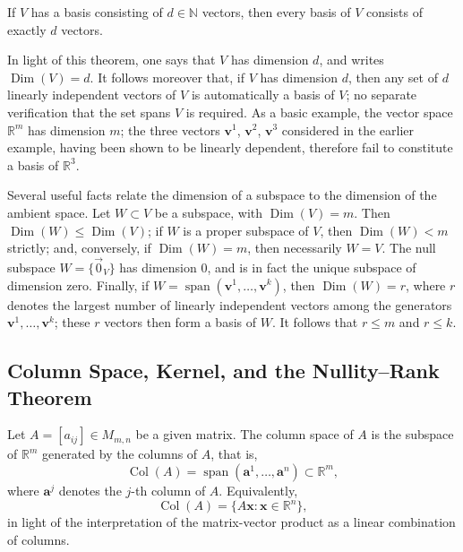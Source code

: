 \begin{theorem}
If $V$ has a basis consisting of $d \in \mathbb{N}$ vectors, then every basis of $V$ consists of exactly $d$ vectors.
\end{theorem}

In light of this theorem, one says that $V$ has dimension $d$, and writes $\operatorname{Dim}(V) = d$. It follows moreover that, if $V$ has dimension $d$, then any set of $d$ linearly independent vectors of $V$ is automatically a basis of $V$; no separate verification that the set spans $V$ is required. As a basic example, the vector space $\mathbb{R}^m$ has dimension $m$; the three vectors $\mathbf{v}^1$, $\mathbf{v}^2$, $\mathbf{v}^3$ considered in the earlier example, having been shown to be linearly dependent, therefore fail to constitute a basis of $\mathbb{R}^3$.

Several useful facts relate the dimension of a subspace to the dimension of the ambient space. Let $W \subset V$ be a subspace, with $\operatorname{Dim}(V) = m$. Then $\operatorname{Dim}(W) \leq \operatorname{Dim}(V)$; if $W$ is a proper subspace of $V$, then $\operatorname{Dim}(W) < m$ strictly; and, conversely, if $\operatorname{Dim}(W) = m$, then necessarily $W = V$. The null subspace $W = \{\vec{0}_V\}$ has dimension $0$, and is in fact the unique subspace of dimension zero. Finally, if $W = \operatorname{span}(\mathbf{v}^1, \dots, \mathbf{v}^k)$, then $\operatorname{Dim}(W) = r$, where $r$ denotes the largest number of linearly independent vectors among the generators $\mathbf{v}^1, \dots, \mathbf{v}^k$; these $r$ vectors then form a basis of $W$. It follows that $r \leq m$ and $r \leq k$.

\subsection{Column Space, Kernel, and the Nullity--Rank Theorem}

\begin{definition}
Let $A = [a_{ij}] \in M_{m,n}$ be a given matrix. The column space of $A$ is the subspace of $\mathbb{R}^m$ generated by the columns of $A$, that is,
\[
\operatorname{Col}(A) = \operatorname{span}(\mathbf{a}^1, \dots, \mathbf{a}^n) \subset \mathbb{R}^m,
\] where $\mathbf{a}^j$ denotes the $j$-th column of $A$. Equivalently,
\[
\operatorname{Col}(A) = \{ A\mathbf{x} : \mathbf{x} \in \mathbb{R}^n \},
\]
in light of the interpretation of the matrix-vector product as a linear combination of columns.
\end{definition}

